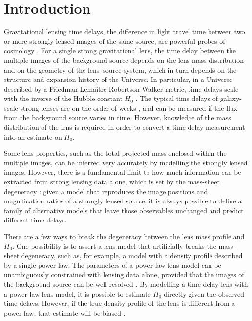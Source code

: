 \documentclass{aa}
\begin{document}
   \maketitle
%

\section{Introduction}

Gravitational lensing time delays, the difference in light travel time between two or more strongly lensed images of the same source, are powerful probes of cosmology \citep{T+M16}.
For a single strong gravitational lens, the time delay between the multiple images of the background source depends on the lens mass distribution and on the geometry of the lens--source system, which in turn depends on the structure and expansion history of the Universe. In particular, in a Universe described by a Friedman-Lema\^{i}tre-Robertson-Walker metric, time delays scale with the inverse of the Hubble constant $H_0$ \citep{Ref64}.
The typical time delays of galaxy-scale strong lenses are on the order of weeks \citep[see e.g.][]{Mil++20b}, and can be measured if the flux from the background source varies in time.
However, knowledge of the mass distribution of the lens is required in order to convert a time-delay measurement into an estimate on $H_0$.

Some lens properties, such as the total projected mass enclosed within the multiple images, can be inferred very accurately by modelling the strongly lensed images. However, there is a fundamental limit to how much information can be extracted from strong lensing data alone, which is set by the mass-sheet degeneracy \citep{FGS85}: given a model that reproduces the image positions and magnification ratios of a strongly lensed source, it is always possible to define a family of alternative models that leave those observables unchanged and predict different time delays.

There are a few ways to break the degeneracy between the lens mass profile and $H_0$. One possibility is to assert a lens model that artificially breaks the mass-sheet degeneracy, such as, for example, a model with a density profile described by a single power law. %
The parameters of a power-law lens model can be unambiguously constrained with lensing data alone, provided that the images of the background source can be well resolved \citep[see e.g.][]{Suy12}. 
By modelling a time-delay lens with a power-law lens model, it is possible to estimate $H_0$ directly given the observed time delays. However, if the true density profile of the lens is different from a power law, that estimate will be biased \citep[see e.g.][]{S+S13}.
\end{document}

